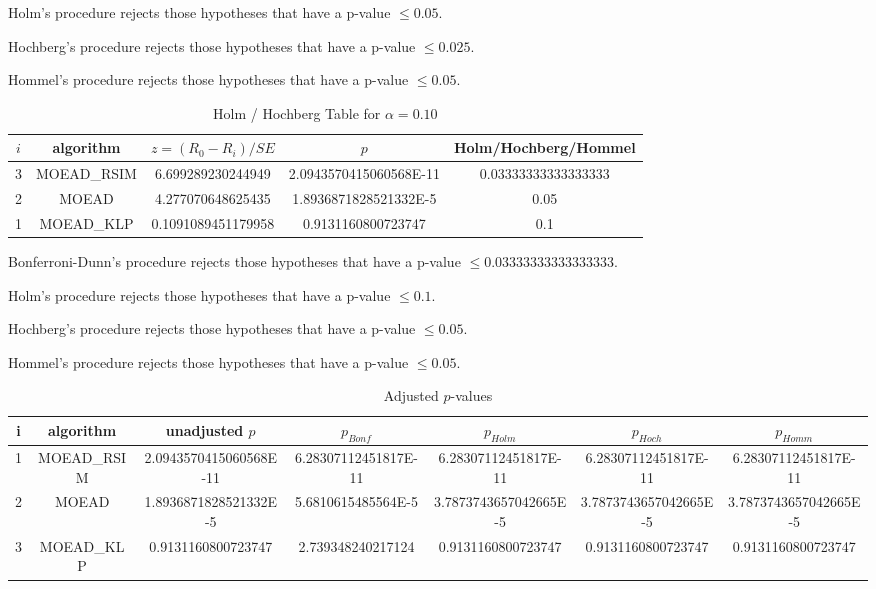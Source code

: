 \documentclass[a4paper,10pt]{article}
\begin{document}
\begin{landscape}
Holm's procedure rejects those hypotheses that have a p-value $\le0.05$.


Hochberg's procedure rejects those hypotheses that have a p-value $\le0.025$.


Hommel's procedure rejects those hypotheses that have a p-value $\le0.05$.


\begin{table}[!htp]
\centering\tiny
\caption{Holm / Hochberg Table for $\alpha=0.10$}
\begin{tabular}{ccccc}
$i$&algorithm&$z=(R_0 - R_i)/SE$&$p$&Holm/Hochberg/Hommel\\
\hline
3&MOEAD_RSIM&6.699289230244949&2.0943570415060568E-11&0.03333333333333333\\
2&MOEAD&4.277070648625435&1.8936871828521332E-5&0.05\\
1&MOEAD_KLP&0.1091089451179958&0.9131160800723747&0.1\\
\hline
\end{tabular}
\end{table}
Bonferroni-Dunn's procedure rejects those hypotheses that have a p-value $\le0.03333333333333333$.


Holm's procedure rejects those hypotheses that have a p-value $\le0.1$.


Hochberg's procedure rejects those hypotheses that have a p-value $\le0.05$.


Hommel's procedure rejects those hypotheses that have a p-value $\le0.05$.


\begin{table}[!htp]
\centering\tiny
\caption{Adjusted $p$-values}
\begin{tabular}{ccccccc}
i&algorithm&unadjusted $p$&$p_{Bonf}$&$p_{Holm}$&$p_{Hoch}$&$p_{Homm}$\\
\hline
1&MOEAD_RSIM&2.0943570415060568E-11&6.28307112451817E-11&6.28307112451817E-11&6.28307112451817E-11&6.28307112451817E-11\\
2&MOEAD&1.8936871828521332E-5&5.6810615485564E-5&3.7873743657042665E-5&3.7873743657042665E-5&3.7873743657042665E-5\\
3&MOEAD_KLP&0.9131160800723747&2.739348240217124&0.9131160800723747&0.9131160800723747&0.9131160800723747\\
\hline
\end{tabular}
\end{table}


\end{landscape}
\end{document}
